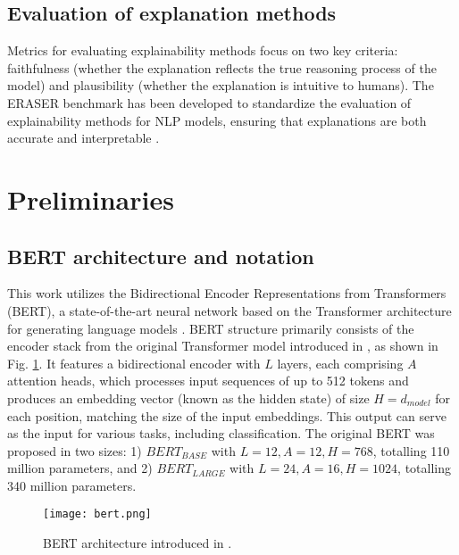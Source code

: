 \documentclass[11pt,a4paper,reqno]{amsart} %
\theoremstyle{definition}
\numberwithin{equation}{section}          %
\begin{document}
\subsection{Evaluation of explanation methods}
Metrics for evaluating explainability methods focus on two key criteria: faithfulness (whether the explanation reflects the true reasoning process of the model) and plausibility (whether the explanation is intuitive to humans). The ERASER benchmark has been developed to standardize the evaluation of explainability methods for NLP models, ensuring that explanations are both accurate and interpretable \cite{deyoung2020}.

\section{Preliminaries}

\subsection{BERT architecture and notation}

This work utilizes the Bidirectional Encoder Representations from Transformers (BERT), a state-of-the-art neural network based on the Transformer architecture for generating language models \cite{DevlinBERT}. BERT structure primarily consists of the encoder stack from the original Transformer model introduced in \cite{2017arXiv170603762V}, as shown in Fig. \ref{fig:bert}. It features a bidirectional encoder with $L$ layers, each comprising $A$ attention heads, which processes input sequences of up to 512 tokens and produces an embedding vector (known as the hidden state) of size $H=d_{model}$ for each position, matching the size of the input embeddings. This output can serve as the input for various tasks, including classification. The original BERT was proposed in two sizes: 1) $BERT_{BASE}$ with $L=12, A=12, H=768$, totalling 110 million parameters, and 2) $BERT_{LARGE}$ with $L=24, A=16, H=1024$, totalling 340 million parameters.

\begin{figure}[h!]
    \centering
    {\texttt{[image: bert.png]}}
    \caption{BERT architecture introduced in \cite{DevlinBERT}.}
    \label{fig:bert}
\end{figure}
\end{document}
